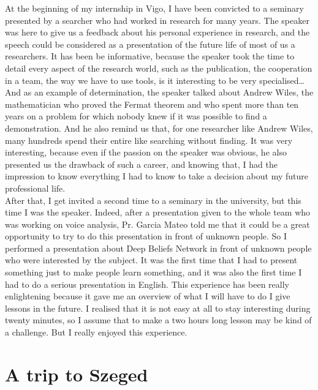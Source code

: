 \documentclass{report}
\begin{document}
		At the beginning of my internship in Vigo, I have been convicted to a seminary presented by a searcher who had worked in research for many years. The speaker was here to give us a feedback about his personal experience in research, and the speech could be considered as a presentation of the future life of most of us a researchers. It has been be informative, because the speaker took the time to detail every aspect of the research world, such as the publication, the cooperation in a team, the way we have to use tools, is it interesting to be very specialised… And as an example of determination, the speaker talked about Andrew Wiles, the mathematician who proved the Fermat theorem and who spent more than ten years on a problem for which nobody knew if it was possible to find a demonstration. And he also remind us that, for one researcher like Andrew Wiles, many hundreds spend their entire like searching without finding. It was very interesting, because even if the passion on the speaker was obvious, he also presented us the drawback of such a career, and knowing that, I had the impression to know everything I had to know to take a decision about my future professional life.\\
		
		After that, I get invited a second time to a seminary in the university, but this time I was the speaker.  Indeed, after a presentation given to the whole team who was working on voice analysis, Pr. Garcia Mateo told me that it could be a great opportunity to try to do this presentation in front of unknown people. So I performed a presentation about Deep Beliefs Network in front of unknown people who were interested by the subject. It was the first time that I had to present something just to make people learn something, and it was also the first time I had to do a serious presentation in English. This experience has been really enlightening because it gave me an overview of what I will have to do I give lessons in the future. I realised that it is not easy at all to stay interesting during twenty minutes, so I assume that to make a two hours long lesson may be kind of a challenge. But I really enjoyed this experience.
		
		\section{A trip to Szeged}
		
\end{document}
